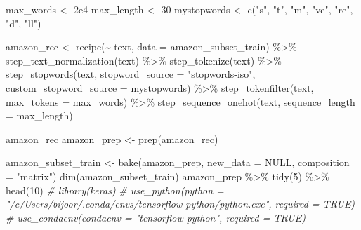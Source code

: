 \documentclass[
]{article}
\newenvironment{Shaded}{}{}
\newcommand{\AttributeTok}[1]{\textcolor[rgb]{0.49,0.56,0.16}{#1}}
\newcommand{\CommentTok}[1]{\textcolor[rgb]{0.38,0.63,0.69}{\textit{#1}}}
\newcommand{\ConstantTok}[1]{\textcolor[rgb]{0.53,0.00,0.00}{#1}}
\newcommand{\DecValTok}[1]{\textcolor[rgb]{0.25,0.63,0.44}{#1}}
\newcommand{\FloatTok}[1]{\textcolor[rgb]{0.25,0.63,0.44}{#1}}
\newcommand{\FunctionTok}[1]{\textcolor[rgb]{0.02,0.16,0.49}{#1}}
\newcommand{\NormalTok}[1]{#1}
\newcommand{\OtherTok}[1]{\textcolor[rgb]{0.00,0.44,0.13}{#1}}
\newcommand{\SpecialCharTok}[1]{\textcolor[rgb]{0.25,0.44,0.63}{#1}}
\newcommand{\StringTok}[1]{\textcolor[rgb]{0.25,0.44,0.63}{#1}}
\begin{document}
\begin{Shaded}
\begin{Highlighting}[]
\NormalTok{max\_words }\OtherTok{\textless{}{-}} \FloatTok{2e4}
\NormalTok{max\_length }\OtherTok{\textless{}{-}} \DecValTok{30}
\NormalTok{mystopwords }\OtherTok{\textless{}{-}} \FunctionTok{c}\NormalTok{(}\StringTok{"s"}\NormalTok{, }\StringTok{"t"}\NormalTok{, }\StringTok{"m"}\NormalTok{, }\StringTok{"ve"}\NormalTok{, }\StringTok{"re"}\NormalTok{, }\StringTok{"d"}\NormalTok{, }\StringTok{"ll"}\NormalTok{)}

\NormalTok{amazon\_rec }\OtherTok{\textless{}{-}} \FunctionTok{recipe}\NormalTok{(}\SpecialCharTok{\textasciitilde{}}\NormalTok{ text, }\AttributeTok{data =}\NormalTok{ amazon\_subset\_train) }\SpecialCharTok{\%\textgreater{}\%}
  \FunctionTok{step\_text\_normalization}\NormalTok{(text) }\SpecialCharTok{\%\textgreater{}\%}
  \FunctionTok{step\_tokenize}\NormalTok{(text) }\SpecialCharTok{\%\textgreater{}\%}
  \FunctionTok{step\_stopwords}\NormalTok{(text, }
                 \AttributeTok{stopword\_source =} \StringTok{"stopwords{-}iso"}\NormalTok{,}
                 \AttributeTok{custom\_stopword\_source =}\NormalTok{ mystopwords) }\SpecialCharTok{\%\textgreater{}\%}
  \FunctionTok{step\_tokenfilter}\NormalTok{(text, }\AttributeTok{max\_tokens =}\NormalTok{ max\_words) }\SpecialCharTok{\%\textgreater{}\%}
  \FunctionTok{step\_sequence\_onehot}\NormalTok{(text, }\AttributeTok{sequence\_length =}\NormalTok{ max\_length)}

\NormalTok{amazon\_rec}
\NormalTok{amazon\_prep }\OtherTok{\textless{}{-}}  \FunctionTok{prep}\NormalTok{(amazon\_rec)}

\NormalTok{amazon\_subset\_train }\OtherTok{\textless{}{-}} \FunctionTok{bake}\NormalTok{(amazon\_prep, }\AttributeTok{new\_data =} \ConstantTok{NULL}\NormalTok{, }\AttributeTok{composition =} \StringTok{"matrix"}\NormalTok{)}
\FunctionTok{dim}\NormalTok{(amazon\_subset\_train)}
\NormalTok{amazon\_prep }\SpecialCharTok{\%\textgreater{}\%} \FunctionTok{tidy}\NormalTok{(}\DecValTok{5}\NormalTok{) }\SpecialCharTok{\%\textgreater{}\%} \FunctionTok{head}\NormalTok{(}\DecValTok{10}\NormalTok{)}
\CommentTok{\# library(keras)}
\CommentTok{\# use\_python(python = "/c/Users/bijoor/.conda/envs/tensorflow{-}python/python.exe", required = TRUE)}
\CommentTok{\# use\_condaenv(condaenv = "tensorflow{-}python", required = TRUE)}


\end{Highlighting}
\end{Shaded}
\end{document}
